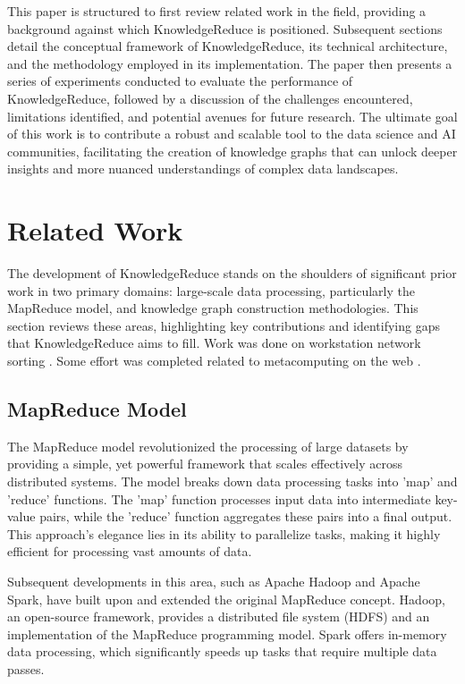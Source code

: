 \documentclass{article}
\begin{document}
This paper is structured to first review related work in the field, providing a background against which KnowledgeReduce is positioned. Subsequent sections detail the conceptual framework of KnowledgeReduce, its technical architecture, and the methodology employed in its implementation. The paper then presents a series of experiments conducted to evaluate the performance of KnowledgeReduce, followed by a discussion of the challenges encountered, limitations identified, and potential avenues for future research. The ultimate goal of this work is to contribute a robust and scalable tool to the data science and AI communities, facilitating the creation of knowledge graphs that can unlock deeper insights and more nuanced understandings of complex data landscapes.

\section{Related Work}
The development of KnowledgeReduce stands on the shoulders of significant prior work in two primary domains: large-scale data processing, particularly the MapReduce model, and knowledge graph construction methodologies. This section reviews these areas, highlighting key contributions and identifying gaps that KnowledgeReduce aims to fill. Work was done on workstation network sorting \cite{arpaci1997high}. Some effort was completed related to metacomputing on the web \cite{baratloo1999charlotte}.

\subsection{MapReduce Model}
The MapReduce model revolutionized the processing of large datasets by providing a simple, yet powerful framework that scales effectively across distributed systems. The model breaks down data processing tasks into 'map' and 'reduce' functions. The 'map' function processes input data into intermediate key-value pairs, while the 'reduce' function aggregates these pairs into a final output. This approach's elegance lies in its ability to parallelize tasks, making it highly efficient for processing vast amounts of data.

Subsequent developments in this area, such as Apache Hadoop and Apache Spark, have built upon and extended the original MapReduce concept. Hadoop, an open-source framework, provides a distributed file system (HDFS) and an implementation of the MapReduce programming model. Spark offers in-memory data processing, which significantly speeds up tasks that require multiple data passes. 
\end{document}
